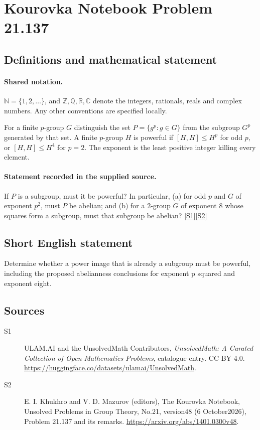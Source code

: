 \documentclass[11pt]{article}
\newcommand{\sref}[2]{\hyperlink{source:#1:#2}{[S#2]}}
\begin{document}
\section{Kourovka Notebook Problem 21.137}\label{statement}

\subsection{Definitions and mathematical statement}

\paragraph{Shared notation.}$\mathbb N=\{1,2,\ldots\}$, and $\mathbb Z,\mathbb Q,\mathbb R,\mathbb C$ denote the integers, rationals, reals and complex numbers. Any other conventions are specified locally.


For a finite $p$-group $G$ distinguish the set $P=\{g^p:g\in G\}$ from the subgroup $G^p$ generated by that set. A finite $p$-group $H$ is powerful if $[H,H]\leq H^p$ for odd $p$, or $[H,H]\leq H^4$ for $p=2$. The exponent is the least positive integer killing every element.
\paragraph{Statement recorded in the supplied source.}
If $P$ is a subgroup, must it be powerful? In particular, (a) for odd $p$ and $G$ of exponent $p^2$, must $P$ be abelian; and (b) for a $2$-group $G$ of exponent $8$ whose squares form a subgroup, must that subgroup be abelian? \sref{statement}{1}\sref{statement}{2}
\subsection{Short English statement}
Determine whether a power image that is already a subgroup must be powerful, including the proposed abelianness conclusions for exponent p squared and exponent eight.
\subsection{Sources}
\begin{description}
\item[\hypertarget{source:statement:1}{S1}] ULAM.AI and the UnsolvedMath Contributors, \emph{UnsolvedMath: A Curated Collection of Open Mathematics Problems}, catalogue entry. CC BY 4.0. \url{https://huggingface.co/datasets/ulamai/UnsolvedMath}.
\item[\hypertarget{source:statement:2}{S2}] E. I. Khukhro and V. D. Mazurov (editors), The Kourovka Notebook, Unsolved Problems in Group Theory, No.21, version48 (6 October2026), Problem 21.137 and its remarks. \url{https://arxiv.org/abs/1401.0300v48}.
\end{description}
\label{end:statement}
\end{document}
